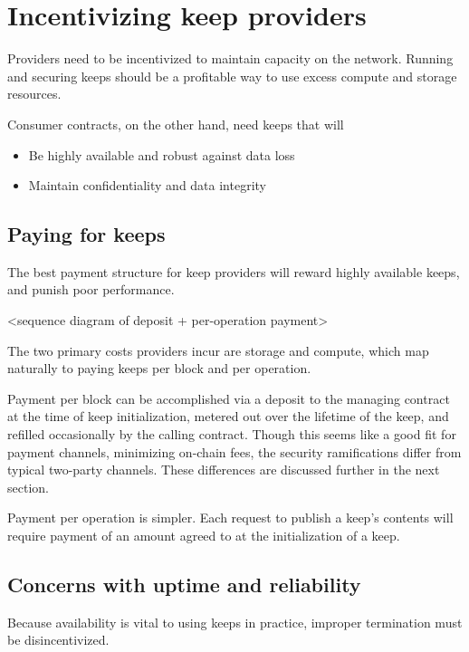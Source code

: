 \documentclass[11pt]{article}
\begin{document}
\section{Incentivizing keep providers} \label{incentivizingProviders}

Providers need to be incentivized to maintain capacity on the network.
Running and securing keeps should be a profitable way to use excess
compute and storage resources.

Consumer contracts, on the other hand, need keeps that will

\begin{itemize}
  \item Be highly available and robust against data loss
  \item Maintain confidentiality and data integrity
\end{itemize}

\subsection{Paying for keeps}

The best payment structure for keep providers will reward highly
available keeps, and punish poor performance.

<sequence diagram of deposit + per-operation payment>

The two primary costs providers incur are storage and compute, which
map naturally to paying keeps per block and per operation.

Payment per block can be accomplished via a deposit to the managing
contract at the time of keep initialization, metered out over the
lifetime of the keep, and refilled occasionally by the calling
contract. Though this seems like a good fit for payment channels,
minimizing on-chain fees, the security ramifications differ from
typical two-party channels. These differences are discussed further in
the next section.

Payment per operation is simpler. Each request to publish a keep's
contents will require payment of an amount agreed to at the
initialization of a keep.

\subsection{Concerns with uptime and reliability} \label{uptime}

Because availability is vital to using keeps in practice, improper
termination must be disincentivized.
\end{document}
